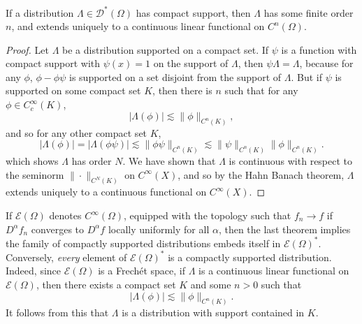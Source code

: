 \begin{theorem}
    If a distribution $\Lambda \in \mathcal{D}^*(\Omega)$ has compact support, then $\Lambda$ has some finite order $n$, and extends uniquely to a continuous linear functional on $C^n(\Omega)$.
\end{theorem}
\begin{proof}
    Let $\Lambda$ be a distribution supported on a compact set. If $\psi$ is a function with compact support with $\psi(x) = 1$ on the support of $\Lambda$, then $\psi \Lambda = \Lambda$, because for any $\phi$, $\phi - \phi \psi$ is supported on a set disjoint from the support of $\Lambda$. But if $\psi$ is supported on some compact set $K$, then there is $n$ such that for any $\phi \in C_c^\infty(K)$,
    \[ |\Lambda(\phi)| \lesssim \| \phi \|_{C^n(K)}, \]
    and so for any other compact set $K$,
    \[ |\Lambda(\phi)| = |\Lambda(\phi \psi)| \lesssim \| \phi \psi \|_{C^n(K)} \lesssim \| \psi \|_{C^n(K)} \| \phi \|_{C^n(K)}. \]
    which shows $\Lambda$ has order $N$. We have shown that $\Lambda$ is continuous with respect to the seminorm $\| \cdot \|_{C^N(K)}$ on $C^\infty(X)$, and so by the Hahn Banach theorem, $\Lambda$ extends uniquely to a continuous functional on $C^\infty(X)$.
\end{proof}

If $\mathcal{E}(\Omega)$ denotes $C^\infty(\Omega)$, equipped with the topology such that $f_n \to f$ if $D^\alpha f_n$ converges to $D^\alpha f$ locally uniformly for all $\alpha$, then the last theorem implies the family of compactly supported distributions embeds itself in $\mathcal{E}(\Omega)^*$. Conversely, \emph{every} element of $\mathcal{E}(\Omega)^*$ is a compactly supported distribution. Indeed, since $\mathcal{E}(\Omega)$ is a Frech\'{e}t space, if $\Lambda$ is a continuous linear functional on $\mathcal{E}(\Omega)$, then there exists a compact set $K$ and some $n > 0$ such that
%
\[ |\Lambda(\phi)| \lesssim \| \phi \|_{C^n(K)}. \]
%
It follows from this that $\Lambda$ is a distribution with support contained in $K$.

